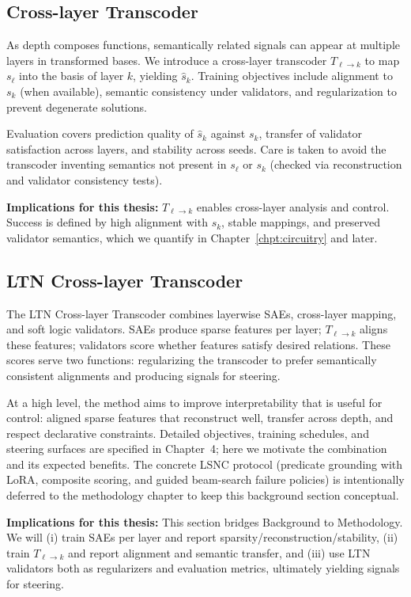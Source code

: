 \documentclass[../ppgc-tese.tex]{subfiles}
\begin{document}
\subsection{Cross-layer Transcoder}
As depth composes functions, semantically related signals can appear at multiple layers in transformed bases. We introduce a cross-layer transcoder $T_{\ell\to k}$ to map $s_\ell$ into the basis of layer $k$, yielding $\hat s_k$. Training objectives include alignment to $s_k$ (when available), semantic consistency under validators, and regularization to prevent degenerate solutions.

Evaluation covers prediction quality of $\hat s_k$ against $s_k$, transfer of validator satisfaction across layers, and stability across seeds. Care is taken to avoid the transcoder inventing semantics not present in $s_\ell$ or $s_k$ (checked via reconstruction and validator consistency tests).

\textbf{Implications for this thesis:} $T_{\ell\to k}$ enables cross-layer analysis and control. Success is defined by high alignment with $s_k$, stable mappings, and preserved validator semantics, which we quantify in Chapter~\ref{chpt:circuitry} and later.

\subsection{LTN Cross-layer Transcoder}
The LTN Cross-layer Transcoder combines layerwise SAEs, cross-layer mapping, and soft logic validators. SAEs produce sparse features per layer; $T_{\ell\to k}$ aligns these features; validators score whether features satisfy desired relations. These scores serve two functions: regularizing the transcoder to prefer semantically consistent alignments and producing signals for steering.

At a high level, the method aims to improve interpretability that is useful for control: aligned sparse features that reconstruct well, transfer across depth, and respect declarative constraints. Detailed objectives, training schedules, and steering surfaces are specified in Chapter~4; here we motivate the combination and its expected benefits.
The concrete LSNC protocol (predicate grounding with LoRA, composite scoring, and guided beam-search failure policies) is intentionally deferred to the methodology chapter to keep this background section conceptual.

\textbf{Implications for this thesis:} This section bridges Background to Methodology. We will (i) train SAEs per layer and report sparsity\slash reconstruction\slash stability, (ii) train $T_{\ell\to k}$ and report alignment and semantic transfer, and (iii) use LTN validators both as regularizers and evaluation metrics, ultimately yielding signals for steering.
\end{document}
